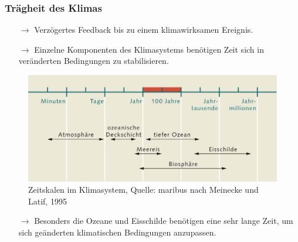 \begin{frame}
	\frametitle{Trägheit des Klimas}
  \begin{itemize}
    \item[$\rightarrow$] Verzögertes Feedback bis zu einem klimawirksamen Ereignis.
    \item[$\rightarrow$] Einzelne Komponenten des Klimasystems benötigen Zeit sich in veränderten Bedingungen zu stabilisieren.
  \end{itemize}

	\begin{figure}
		\centering
		\includegraphics[width=0.8\linewidth]{bilder/zeitskala-klimasystem_world_ocean_review.jpg}
		\caption{Zeitskalen im Klimasystem, Quelle: maribus nach Meinecke und Latif, 1995}
		\label{fig:traegheit}
	\end{figure}

  \begin{itemize}
    \item[$\rightarrow$] Besonders die Ozeane und Eisschilde benötigen eine sehr lange Zeit, um sich geänderten klimatischen Bedingungen anzupassen.
  \end{itemize}

\end{frame}
